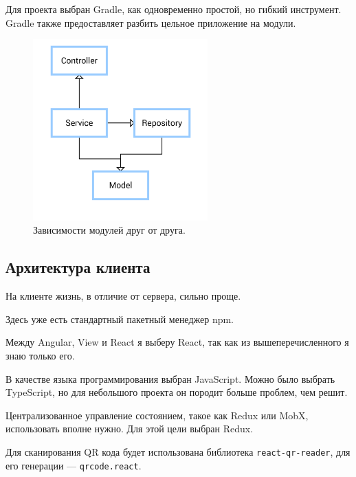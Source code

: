 Для проекта выбран Gradle, как одновременно простой, но гибкий инструмент.
Gradle также предоставляет разбить цельное приложение на модули.

\begin{figure}[ht]
    \centering
    \includegraphics[width=0.6\textwidth]{../resources/moduleDependencies.png}
    \caption{Зависимости модулей друг от друга.}
    \label{fig:moduleDependencies}
\end{figure}

\subsection{Архитектура клиента}
На клиенте жизнь, в отличие от сервера, сильно проще.

Здесь уже есть стандартный пакетный менеджер npm.

Между Angular, View и React я выберу React, так как из вышеперечисленного я знаю только его.

В качестве языка программирования выбран JavaScript.
Можно было выбрать TypeScript, но для небольшого проекта он породит больше проблем, чем решит.

Централизованное управление состоянием, такое как Redux или MobX, использовать вполне нужно.
Для этой цели выбран Redux.

Для сканирования QR кода будет использована библиотека \texttt{react-qr-reader}, для его генерации --- \texttt{qrcode.react}.

